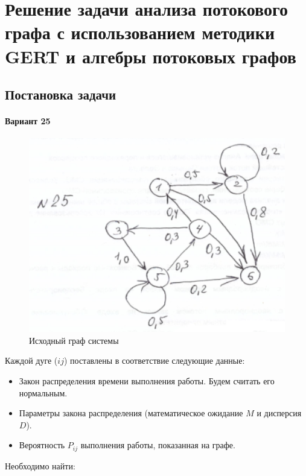 \chapter{Решение задачи анализа потокового графа с использованием методики GERT и алгебры потоковых графов}

\section{Постановка задачи}

\subsubsection{Вариант 25}

\begin{figure}[h!]
	\centering
	\includegraphics[scale = 0.95]{images/p4_0.png}
	\caption{Исходный граф системы}
	\label{image:p4_0}
\end{figure}

Каждой дуге ($ij$) поставлены в соответствие следующие данные:

\begin{itemize}
	\item Закон распределения времени выполнения работы. Будем считать его нормальным.
	\item Параметры закона распределения (математическое ожидание $M$ и дисперсия $D$).
	\item Вероятность $P_{ij}$ выполнения работы, показанная на графе.
\end{itemize}

Необходимо найти:

